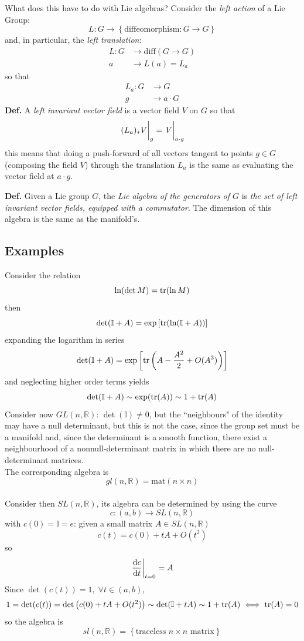 What does this have to do with Lie algebras? Consider the \textit{left
action} of a Lie Group:
$$L: G\to\left\{\text{diffeomorphism}:G\to G\right\}$$
and, in particular, the \textit{left translation}:
\begin{align*}
    L:G&\to \text{diff}(G\to G)\\
        a&\to L(a) = L_a
\end{align*}
so that
\begin{align*}
    L_a:G&\to G\\
        g&\to a\cdot G
\end{align*}
\textbf{Def.} A \textit{left invariant vector field} is a vector field
$V$ on $G$ so that
$$\eval{(L_a)_* V}_g = \eval{V}_{a\cdot g}$$
this means that doing a push-forward of all vectors tangent to points $g\in G$
(composing the field $V$) through the translation $L_a$ is the same as evaluating
the vector field at $a\cdot g$.

\textbf{Def.} Given a Lie group $G$, the \textit{Lie algebra of the generators of
$G$} is \textit{the set of left invariant vector fields, equipped with a
commutator}. The dimension of this algebra is the same as the manifold's.
\subsection{Examples}
Consider the relation
$$\ln(\det M) = \tr(\ln M )$$
then
$$\det (\mathbb{I}+A) = \exp\left[\tr(\ln(\mathbb{I}+A))\right]$$
expanding the logarithm in series
$$\det(\mathbb{I}+A) = \exp\left[\tr \left(A-\frac{A^2}{2}+O(A^3)\right)\right]$$
and neglecting higher order terms yields
$$\det(\mathbb{I}+A)\sim \exp(\tr(A))\sim 1+\tr(A)$$
Consider now $GL(n,\mathbb{R})$: $\det(\mathbb{I})\neq 0$, but the ``neighbours"
of the identity may have a null determinant, but this is not the case, since
the group set must be a manifold and, since the determinant is a smooth function,
there exist a neighbourhood of a nonnull-determinant matrix in which there are no
null-determinant matrices.\\
The corresponding algebra is
$$gl(n,\mathbb{R}) = \text{mat}(n\times n)$$\\

Consider then $SL(n,\mathbb{R})$, its algebra can be determined by using the curve
$$c:(a,b)\to SL(n,\mathbb{R})$$
with $c(0)=\mathbb{I}=e$: given a small matrix $A\in SL(n,\mathbb{R})$
$$c(t) = c(0)+tA+O(t^2)$$
so
$$\eval{\dv{c}{t}}_{t=0}=A$$
Since $\det(c(t))=1,\;\forall t\in(a,b)$,
$$1=\det(c(t)) = \det\left(c(0)+tA +O(t^2)\right)\sim \det(\mathbb{I}+tA)\sim
1+\tr(A)\iff \tr(A)=0$$
so the algebra is
$$sl(n,\mathbb{R})=\left\{\text{traceless }n\times n\text{ matrix}\right\}$$\\

